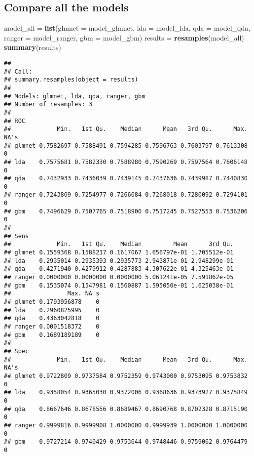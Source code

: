 \documentclass[]{article}
\newenvironment{Shaded}{\begin{snugshade}}{\end{snugshade}}
\newcommand{\KeywordTok}[1]{\textcolor[rgb]{0.13,0.29,0.53}{\textbf{#1}}}
\newcommand{\DataTypeTok}[1]{\textcolor[rgb]{0.13,0.29,0.53}{#1}}
\newcommand{\StringTok}[1]{\textcolor[rgb]{0.31,0.60,0.02}{#1}}
\newcommand{\NormalTok}[1]{#1}
\begin{document}
\subsection{Compare all the models}\label{compare-all-the-models}

\begin{Shaded}
\begin{Highlighting}[]
\NormalTok{model_all =}\StringTok{ }\KeywordTok{list}\NormalTok{(}\DataTypeTok{glmnet =}\NormalTok{ model_glmnet, }\DataTypeTok{lda =}\NormalTok{ model_lda, }\DataTypeTok{qda =}\NormalTok{ model_qda, }\DataTypeTok{ranger =}\NormalTok{ model_ranger,}
                 \DataTypeTok{gbm =}\NormalTok{ model_gbm)}
\NormalTok{results =}\StringTok{ }\KeywordTok{resamples}\NormalTok{(model_all)}
\KeywordTok{summary}\NormalTok{(results)}
\end{Highlighting}
\end{Shaded}

\begin{verbatim}
## 
## Call:
## summary.resamples(object = results)
## 
## Models: glmnet, lda, qda, ranger, gbm 
## Number of resamples: 3 
## 
## ROC 
##             Min.   1st Qu.    Median      Mean   3rd Qu.      Max. NA's
## glmnet 0.7582697 0.7588491 0.7594285 0.7596763 0.7603797 0.7613308    0
## lda    0.7575681 0.7582330 0.7588980 0.7590269 0.7597564 0.7606148    0
## qda    0.7432933 0.7436039 0.7439145 0.7437636 0.7439987 0.7440830    0
## ranger 0.7243869 0.7254977 0.7266084 0.7268018 0.7280092 0.7294101    0
## gbm    0.7496629 0.7507765 0.7518900 0.7517245 0.7527553 0.7536206    0
## 
## Sens 
##             Min.   1st Qu.    Median         Mean      3rd Qu.
## glmnet 0.1559368 0.1588217 0.1617067 1.656797e-01 1.705512e-01
## lda    0.2935014 0.2935393 0.2935773 2.943871e-01 2.948299e-01
## qda    0.4271940 0.4279912 0.4287883 4.307622e-01 4.325463e-01
## ranger 0.0000000 0.0000000 0.0000000 5.061241e-05 7.591862e-05
## gbm    0.1535074 0.1547981 0.1560887 1.595050e-01 1.625038e-01
##                Max. NA's
## glmnet 0.1793956878    0
## lda    0.2960825995    0
## qda    0.4363042818    0
## ranger 0.0001518372    0
## gbm    0.1689189189    0
## 
## Spec 
##             Min.   1st Qu.    Median      Mean   3rd Qu.      Max. NA's
## glmnet 0.9722809 0.9737584 0.9752359 0.9743000 0.9753095 0.9753832    0
## lda    0.9358054 0.9365030 0.9372006 0.9368636 0.9373927 0.9375849    0
## qda    0.8667646 0.8678556 0.8689467 0.8690768 0.8702328 0.8715190    0
## ranger 0.9999816 0.9999908 1.0000000 0.9999939 1.0000000 1.0000000    0
## gbm    0.9727214 0.9740429 0.9753644 0.9748446 0.9759062 0.9764479    0
\end{verbatim}
\end{document}
